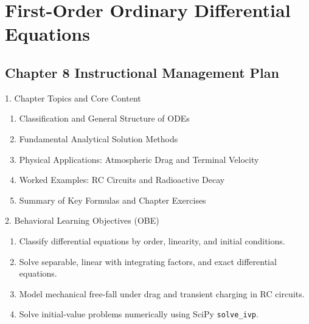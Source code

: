 \chapter{First-Order Ordinary Differential Equations}

\section*{Chapter 8 Instructional Management Plan}

\begin{planbox}[colframe=rbruNavy, colbacktitle=rbruNavy]{1. Chapter Topics and Core Content}
\begin{enumerate}[topsep=2pt, itemsep=1pt, partopsep=0pt, parsep=0pt, leftmargin=1.5em]
    \item Classification and General Structure of ODEs
    \item Fundamental Analytical Solution Methods
    \item Physical Applications: Atmospheric Drag and Terminal Velocity
    \item Worked Examples: RC Circuits and Radioactive Decay
    \item Summary of Key Formulas and Chapter Exercises
\end{enumerate}
\end{planbox}

\begin{planbox}[colframe=rbruGreen, colbacktitle=rbruGreen]{2. Behavioral Learning Objectives (OBE)}
\begin{enumerate}[topsep=2pt, itemsep=1pt, partopsep=0pt, parsep=0pt, leftmargin=1.5em]
    \item Classify differential equations by order, linearity, and initial conditions.
    \item Solve separable, linear with integrating factors, and exact differential equations.
    \item Model mechanical free-fall under drag and transient charging in RC circuits.
    \item Solve initial-value problems numerically using SciPy \texttt{solve\_ivp}.
\end{enumerate}
\end{planbox}

